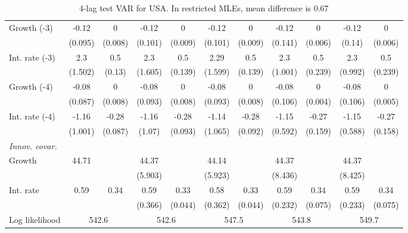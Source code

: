 \begin{table}[htbp]
\begin{tabular}{@{\extracolsep{4pt}}lcccccccccc@{}}
\quad Growth (-3) 	 &-0.12 	 & 0 	 & -0.12 	 & 0 	 & -0.12 	 & 0 	 & -0.12 	 & 0 	 & -0.12 	 & 0	 \\ 
 		 & (0.095) 	 & (0.008) 	 & (0.101) 	 & (0.009) 	 & (0.101) 	 & (0.009) 	 & (0.141) 	 & (0.006) 	 & (0.14) 	 & (0.006) 	 \\ 
\quad Int. rate (-3) 	 &2.3 	 & 0.5 	 & 2.3 	 & 0.5 	 & 2.29 	 & 0.5 	 & 2.3 	 & 0.5 	 & 2.3 	 & 0.5	 \\ 
 		 & (1.502) 	 & (0.13) 	 & (1.605) 	 & (0.139) 	 & (1.599) 	 & (0.139) 	 & (1.001) 	 & (0.239) 	 & (0.992) 	 & (0.239) 	 \\ 
\quad Growth (-4) 	 &-0.08 	 & 0 	 & -0.08 	 & 0 	 & -0.08 	 & 0 	 & -0.08 	 & 0 	 & -0.08 	 & 0	 \\ 
 		 & (0.087) 	 & (0.008) 	 & (0.093) 	 & (0.008) 	 & (0.093) 	 & (0.008) 	 & (0.106) 	 & (0.004) 	 & (0.106) 	 & (0.005) 	 \\ 
\quad Int. rate (-4) 	 &-1.16 	 & -0.28 	 & -1.16 	 & -0.28 	 & -1.14 	 & -0.28 	 & -1.15 	 & -0.27 	 & -1.15 	 & -0.27	 \\ 
 		 & (1.001) 	 & (0.087) 	 & (1.07) 	 & (0.093) 	 & (1.065) 	 & (0.092) 	 & (0.592) 	 & (0.159) 	 & (0.588) 	 & (0.158) 	 \\ 
\rule{0pt}{4ex} \emph{Innov. covar.}  	 & 	 & 	 & 	 & 	 & 	 & 	 & 	 & 	 & 	 &\\ 
\quad Growth 	 &44.71 	 &  	 & 44.37 	 &  	 & 44.14 	 &  	 & 44.37 	 &  	 & 44.37 	 & 	 \\ 
 		 &  	 &  	 & (5.903) 	 &  	 & (5.923) 	 &  	 & (8.436) 	 &  	 & (8.425) 	 &  	 \\ 
\quad Int. rate 	 &0.59 	 & 0.34 	 & 0.59 	 & 0.33 	 & 0.58 	 & 0.33 	 & 0.59 	 & 0.34 	 & 0.59 	 & 0.34	 \\ 
 		 &  	 &  	 & (0.366) 	 & (0.044) 	 & (0.362) 	 & (0.044) 	 & (0.232) 	 & (0.075) 	 & (0.233) 	 & (0.075) 	 \\ 
 \hline \rule{0pt}{4ex} 
  Log likelihood 	 &\multicolumn{2}{c}{542.6} 	 & \multicolumn{2}{c}{542.6} 	 & \multicolumn{2}{c}{547.5} 	 & \multicolumn{2}{c}{543.8} 	 & \multicolumn{2}{c}{549.7}\\ 

 \hline 	\end{tabular}		\caption{4-lag test VAR for USA. In restricted MLEs, mean difference is 0.67}
		\label{tab:USA4}

\end{table}